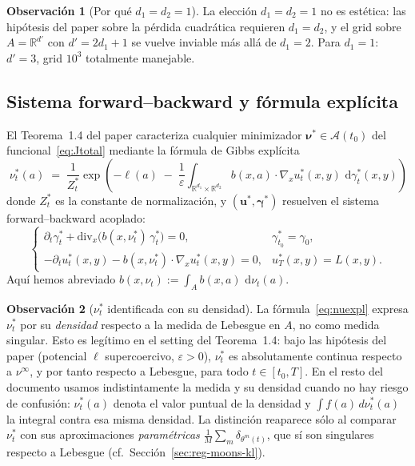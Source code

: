\documentclass[11pt, a4paper]{article}
\theoremstyle{definition}
\newtheorem{remark}{Observación}[section]
\newcommand{\R}{\mathbb{R}}
\newcommand{\eps}{\varepsilon}
\newcommand{\dee}{\,\mathrm{d}}
\begin{document}
\begin{remark}[Por qué $d_1 = d_2 = 1$]
La elección $d_1 = d_2 = 1$ no es estética: las hipótesis del paper
sobre la pérdida cuadrática requieren $d_1 = d_2$, y el grid sobre
$A = \R^{d'}$ con $d' = 2 d_1 + 1$ se vuelve inviable más allá de
$d_1 = 2$. Para $d_1 = 1$: $d' = 3$, grid $10^3$ totalmente manejable.
\end{remark}

\subsection{Sistema forward--backward y fórmula explícita}
\label{ssec:fb-explicita}

El Teorema~1.4 del paper caracteriza cualquier minimizador
$\boldsymbol{\nu}^* \in \mathcal{A}(t_0)$ del funcional~\eqref{eq:Jtotal}
mediante la fórmula de Gibbs explícita
\begin{equation}
  \boxed{\;
    \nu_t^*(a)
    \;=\;
    \frac{1}{Z_t^*}
    \exp\!\left(
      -\ell(a)
      \;-\;
      \frac{1}{\eps}
      \int_{\R^{d_1} \times \R^{d_2}}
        b(x, a) \cdot \nabla_x u_t^*(x, y)
      \, \dee\gamma_t^*(x, y)
    \right)
  \;}
  \label{eq:nuexpl}
\end{equation}
donde $Z_t^*$ es la constante de normalización, y
$(\boldsymbol{u}^*, \boldsymbol{\gamma}^*)$ resuelven el sistema
forward--backward acoplado:
\begin{equation}
  \begin{cases}
    \displaystyle
    \partial_t \gamma_t^*
    + \mathrm{div}_x\!\bigl( b(x, \nu_t^*) \, \gamma_t^* \bigr) = 0,
    & \gamma_{t_0}^* = \gamma_0,
    \\[1ex]
    \displaystyle
    -\partial_t u_t^*(x, y)
    - b(x, \nu_t^*) \cdot \nabla_x u_t^*(x, y) = 0,
    & u_T^*(x, y) = L(x, y).
  \end{cases}
  \label{eq:fbsystem}
\end{equation}
Aquí hemos abreviado $b(x, \nu_t) := \int_A b(x, a) \, \dee\nu_t(a)$.

\begin{remark}[$\nu^*_t$ identificada con su densidad]
\label{rem:medida-densidad}
La fórmula~\eqref{eq:nuexpl} expresa $\nu^*_t$ por su \emph{densidad}
respecto a la medida de Lebesgue en $A$, no como medida singular. Esto
es legítimo en el setting del Teorema~1.4: bajo las hipótesis del paper
(potencial $\ell$ supercoercivo, $\eps>0$), $\nu^*_t$ es absolutamente
continua respecto a $\nu^\infty$, y por tanto respecto a Lebesgue,
para todo $t\in[t_0,T]$. En el resto del documento usamos
indistintamente la medida y su densidad cuando no hay riesgo de
confusión: $\nu^*_t(a)$ denota el valor puntual de la densidad y
$\int f(a)\,d\nu^*_t(a)$ la integral contra esa misma densidad. La
distinción reaparece sólo al comparar $\nu^*_t$ con sus aproximaciones
\emph{paramétricas} $\tfrac1M\sum_m\delta_{\theta^m(t)}$, que sí son
singulares respecto a Lebesgue (cf.\ Sección~\ref{sec:reg-moons-kl}).
\end{remark}
\end{document}
